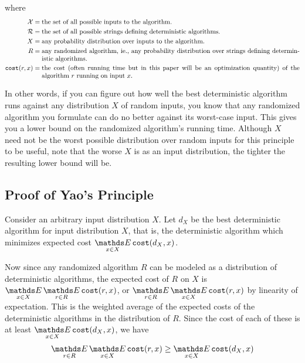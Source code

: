 where \begin{align*}
\mathcal{X} =&\; \text{the set of all possible inputs to the algorithm.}
\\
\mathcal{R} =&\; \text{the set of all possible strings defining deterministic algorithms.}
\\
X =&\; \text{any probability distribution over inputs to the algorithm.}
\\
R =&\; \text{\parbox[t]{5.5in}{any randomized algorithm, ie., any probability distribution over strings defining deterministic algorithms.}}
\\
\texttt{cost}(r, x) =&\; \text{\parbox[t]{5.5in}{the cost (often running time but in this paper will be an optimization quantity) of the algorithm $r$ running on input $x$.}}
\end{align*}

In other words, if you can figure out how well the best deterministic algorithm runs against any distribution $X$ of random inputs, you know that any randomized algorithm you formulate can do no better against its worst-case input. This gives you a lower bound on the randomized algorithm's running time.
Although $X$ need not be the worst possible distribution over random inputs for this principle to be useful, note that the worse $X$ is as an input distribution, the tighter the resulting lower bound will be. 


\subsection{Proof of Yao's Principle}

Consider an arbitrary input distribution $X$. Let $d_X$ be the best deterministic algorithm for input distribution $X$, that is, the deterministic algorithm which minimizes expected cost $\Expected_{x\in X}\texttt{cost}(d_X,x)$.

Now since any randomized algorithm $R$ can be modeled as a distribution of deterministic algorithms, the expected cost of $R$ on $X$ is $\Expected_{x\in X}\Expected_{r\in R}\texttt{cost}(r,x)$, or $\Expected_{r\in R}\Expected_{x\in X}\texttt{cost}(r,x)$ by linearity of expectation. This is the weighted average of the expected costs of the deterministic algorithms in the distribution of $R$. Since the cost of each of these is at least $\Expected_{x\in X}\texttt{cost}(d_X,x)$, we have
\[\Expected_{r\in R}\Expected_{x\in X}\texttt{cost}(r,x) \ge \Expected_{x\in X}\texttt{cost}(d_X,x)\]


